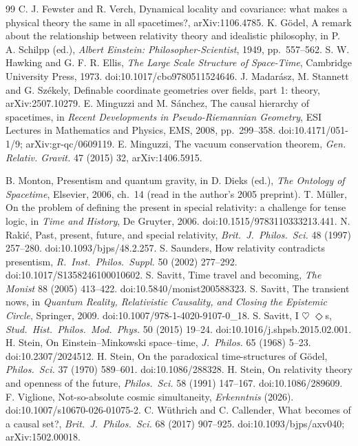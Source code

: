 \documentclass[11pt]{article}
\theoremstyle{definition}
\begin{document}
\begin{thebibliography}{99}
 C. J. Fewster and R. Verch,
Dynamical locality and covariance: what makes a physical theory the same in
all spacetimes?, arXiv:1106.4785.
 K. Gödel, A remark about the relationship
between relativity theory and idealistic philosophy, in P. A. Schilpp (ed.),
\emph{Albert Einstein: Philosopher-Scientist}, 1949, pp.~557--562.
 S. W. Hawking and G. F. R. Ellis,
\emph{The Large Scale Structure of Space-Time}, Cambridge University Press,
1973. doi:10.1017/cbo9780511524646.
 J. Madarász, M. Stannett and
G. Székely, Definable coordinate geometries over fields, part 1: theory,
arXiv:2507.10279.
 E. Minguzzi and M. Sánchez, The
causal hierarchy of spacetimes, in \emph{Recent Developments in
Pseudo-Riemannian Geometry}, ESI Lectures in Mathematics and Physics, EMS,
2008, pp.~299--358. doi:10.4171/051-1/9;
arXiv:gr-qc/0609119.
 E. Minguzzi, The vacuum conservation
theorem, \emph{Gen. Relativ. Gravit.} 47 (2015) 32, arXiv:1406.5915.

 B. Monton, Presentism and quantum gravity,
in D. Dieks (ed.), \emph{The Ontology of Spacetime}, Elsevier, 2006, ch.~14
(read in the author's 2005 preprint).
 T. Müller, On the problem of defining the
present in special relativity: a challenge for tense logic, in
\emph{Time and History}, De Gruyter, 2006. doi:10.1515/9783110333213.441.
 N. Rakić, Past, present, future, and special
relativity, \emph{Brit.\ J.\ Philos.\ Sci.} 48 (1997) 257--280.
doi:10.1093/bjps/48.2.257.
 S. Saunders, How relativity contradicts
presentism, \emph{R.\ Inst.\ Philos.\ Suppl.} 50 (2002) 277--292.
doi:10.1017/S1358246100010602.
 S. Savitt, Time travel and becoming,
\emph{The Monist} 88 (2005) 413--422. doi:10.5840/monist200588323.
 S. Savitt, The transient nows, in
\emph{Quantum Reality, Relativistic Causality, and Closing the Epistemic
Circle}, Springer, 2009. doi:10.1007/978-1-4020-9107-0\_18.
 S. Savitt, I $\heartsuit$ $\Diamond$s,
\emph{Stud.\ Hist.\ Philos.\ Mod.\ Phys.} 50 (2015) 19--24.
doi:10.1016/j.shpsb.2015.02.001.
 H. Stein, On Einstein--Minkowski space--time,
\emph{J.\ Philos.} 65 (1968) 5--23. doi:10.2307/2024512.
 H. Stein, On the paradoxical time-structures
of Gödel, \emph{Philos.\ Sci.} 37 (1970) 589--601. doi:10.1086/288328.
 H. Stein, On relativity theory and openness
of the future, \emph{Philos.\ Sci.} 58 (1991) 147--167. doi:10.1086/289609.
 F. Viglione, Not-so-absolute cosmic
simultaneity, \emph{Erkenntnis} (2026). doi:10.1007/s10670-026-01075-2.
 C. Wüthrich and C. Callender,
What becomes of a causal set?, \emph{Brit.\ J.\ Philos.\ Sci.} 68 (2017)
907--925. doi:10.1093/bjps/axv040; arXiv:1502.00018.
\end{thebibliography}
\end{document}
